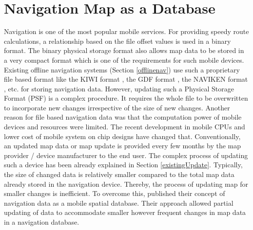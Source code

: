 \section{Navigation Map as a Database} \label{navasdb}
Navigation is one of the most popular mobile services. For providing speedy route calculations, a relationship based on the file offset values is used in a binary format. The binary physical storage format also allows map data to be stored in a very compact format which is one of the requirements for such mobile devices. Existing offline navigation systems (Section \ref{offlinenav}) use such a proprietary file based format like the KIWI format \cite{kiwiinput}, the GDF format \cite{tc204200214825}, the NAVIKEN format \cite{bullock1994analysis}, etc. for storing navigation data. However, updating such a Physical Storage Format (PSF) is a complex procedure. It requires the whole file to be overwritten to incorporate new changes irrespective of the size of new changes. Another reason for file based navigation data was that the computation power of mobile devices and resources were limited. The recent development in mobile CPUs and lower cost of mobile system on chip designs have changed that. Conventionally, an updated map data or map update is provided every few months by the map provider / device manufacturer to the end user. The complex process of updating such a device has been already explained in Section \ref{existingUpdate}. Typically, the size of changed data is relatively smaller compared to the total map data already stored in the navigation device. Thereby, the process of updating map for smaller changes is inefficient. To overcome this, \citet{min2008mobile} published their concept of navigation data as a mobile spatial database. Their approach allowed partial updating of data to accommodate smaller however frequent changes in map data in a navigation database. \\


